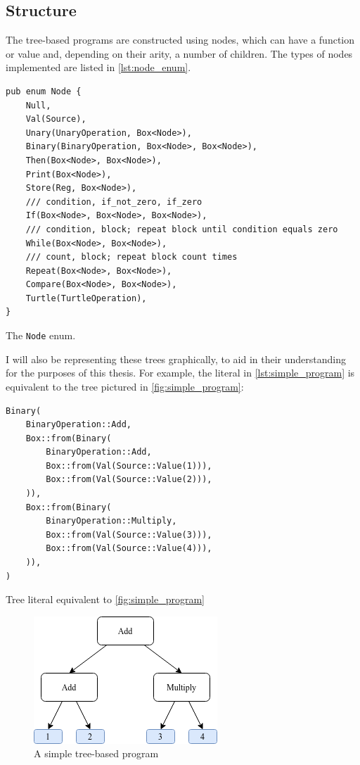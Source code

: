 \documentclass{report}
\newenvironment{code}{\captionsetup{type=listing}}{}
\begin{document}
\subsection{Structure}
The tree-based programs are constructed using nodes, which can have a function or value and, depending on their arity, a number of children. The types of nodes implemented are listed in \autoref{lst:node_enum}.

\begin{code}
    \begin{verbatim}
pub enum Node {
    Null,
    Val(Source),
    Unary(UnaryOperation, Box<Node>),
    Binary(BinaryOperation, Box<Node>, Box<Node>),
    Then(Box<Node>, Box<Node>),
    Print(Box<Node>),
    Store(Reg, Box<Node>),
    /// condition, if_not_zero, if_zero
    If(Box<Node>, Box<Node>, Box<Node>),
    /// condition, block; repeat block until condition equals zero
    While(Box<Node>, Box<Node>),
    /// count, block; repeat block count times
    Repeat(Box<Node>, Box<Node>),
    Compare(Box<Node>, Box<Node>),
    Turtle(TurtleOperation),
}
    \end{verbatim}
    \caption{The \texttt{Node} enum.}
    \label{lst:node_enum}
\end{code}

I will also be representing these trees graphically, to aid in their understanding for the purposes of this thesis. For example, the literal in \autoref{lst:simple_program} is equivalent to the tree pictured in \autoref{fig:simple_program}:

\begin{code}
    \begin{verbatim}
Binary(
    BinaryOperation::Add,
    Box::from(Binary(
        BinaryOperation::Add,
        Box::from(Val(Source::Value(1))),
        Box::from(Val(Source::Value(2))),
    )),
    Box::from(Binary(
        BinaryOperation::Multiply,
        Box::from(Val(Source::Value(3))),
        Box::from(Val(Source::Value(4))),
    )),
)
    \end{verbatim}
    \caption{Tree literal equivalent to \autoref{fig:simple_program}}
    \label{lst:simple_program}
\end{code}

\begin{figure}[H]
    \centering
    \includegraphics[scale=0.75]{tree_1}
    \caption{A simple tree-based program}
    \label{fig:simple_program}
\end{figure}
\end{document}
